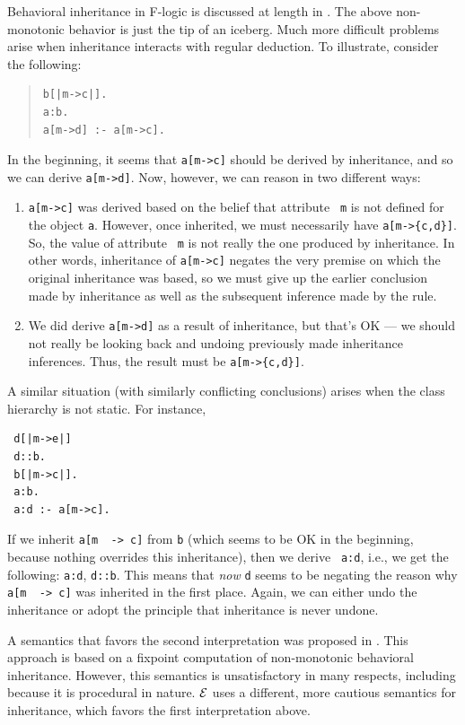 \documentclass[11pt]{article}
\newcommand{\ERGO}{\mbox{\ensuremath{\cal{E}}\smaller{{\sc{RGO}}}}\xspace}
\newcommand{\FLSYSTEM}{\ERGO}
\newcommand{\mvd}{{\mbox{\tt \,->\,}}}  %
\newcommand{\fl}{\mbox{F-logic}\xspace}
\begin{document}
Behavioral inheritance in \fl is discussed at length in
\cite{inheritance-odbase-02,kifer-yang-inheritance-2006}.  The above  non-monotonic behavior is
just the tip of an iceberg. Much more difficult problems arise when
inheritance interacts with regular deduction. To illustrate, consider
the following:
\begin{quote}
\begin{verbatim}
b[|m->c|].
a:b.
a[m->d] :- a[m->c].
\end{verbatim}
\end{quote}
In the beginning, it seems that \verb|a[m->c]| should be derived by
inheritance, and so we can derive \verb|a[m->d]|. Now, however, we can
reason in two different ways:
\begin{enumerate}
\item \verb|a[m->c]| was derived based on the belief that attribute {\tt
    m} is not defined for the object {\tt a}. However, once inherited, we
  must necessarily have \verb|a[m->{c,d}]|. So, the value of attribute {\tt
    m} is not really the one produced by inheritance. In other words,
  inheritance of \verb|a[m->c]| negates the very premise on which the
  original inheritance was based, so we must give up the earlier conclusion
  made by inheritance as well as the subsequent inference made by the rule.
\item We did derive \verb|a[m->d]| as a result of inheritance, but
  that's OK --- we should not really be looking back and undoing previously
  made inheritance inferences. Thus, the result must be \verb|a[m->{c,d}]|.
\end{enumerate}
A similar situation (with similarly conflicting conclusions) arises when
the class hierarchy is not static. For instance, 
\begin{verbatim}
 d[|m->e|]
 d::b.
 b[|m->c|].
 a:b.
 a:d :- a[m->c].  
\end{verbatim}
If we inherit {\tt a[m \mvd c]}  from {\tt b} (which seems to be OK in the
beginning, because nothing overrides this inheritance), then we derive {\tt
  a:d}, i.e., we get the following: {\tt a:d}, {\tt d::b}. This means that
\emph{now} {\tt d} seems to be negating the reason why {\tt a[m \mvd c]} was
inherited in the first place. Again, we can either undo the inheritance or
adopt the principle that inheritance is never undone.

A semantics that favors the second interpretation was proposed in
\cite{KLW95}. This approach is based on a fixpoint computation of
non-monotonic behavioral inheritance.  However, this semantics is 
unsatisfactory in many
respects, including because it is procedural in
nature. \FLSYSTEM uses a
different, more cautious semantics for inheritance, which favors the first
interpretation above.
\end{document}
